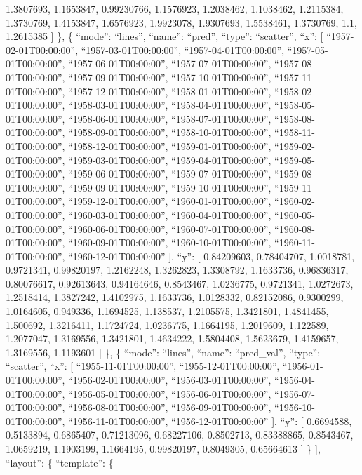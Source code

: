 \documentclass[
]{article}
\begin{document}
1.3807693, 1.1653847, 0.99230766, 1.1576923, 1.2038462, 1.1038462,
1.2115384, 1.3730769, 1.4153847, 1.6576923, 1.9923078, 1.9307693,
1.5538461, 1.3730769, 1.1, 1.2615385 {]} \}, \{ ``mode'': ``lines'',
``name'': ``pred'', ``type'': ``scatter'', ``x'': {[}
``1957-02-01T00:00:00'', ``1957-03-01T00:00:00'',
``1957-04-01T00:00:00'', ``1957-05-01T00:00:00'',
``1957-06-01T00:00:00'', ``1957-07-01T00:00:00'',
``1957-08-01T00:00:00'', ``1957-09-01T00:00:00'',
``1957-10-01T00:00:00'', ``1957-11-01T00:00:00'',
``1957-12-01T00:00:00'', ``1958-01-01T00:00:00'',
``1958-02-01T00:00:00'', ``1958-03-01T00:00:00'',
``1958-04-01T00:00:00'', ``1958-05-01T00:00:00'',
``1958-06-01T00:00:00'', ``1958-07-01T00:00:00'',
``1958-08-01T00:00:00'', ``1958-09-01T00:00:00'',
``1958-10-01T00:00:00'', ``1958-11-01T00:00:00'',
``1958-12-01T00:00:00'', ``1959-01-01T00:00:00'',
``1959-02-01T00:00:00'', ``1959-03-01T00:00:00'',
``1959-04-01T00:00:00'', ``1959-05-01T00:00:00'',
``1959-06-01T00:00:00'', ``1959-07-01T00:00:00'',
``1959-08-01T00:00:00'', ``1959-09-01T00:00:00'',
``1959-10-01T00:00:00'', ``1959-11-01T00:00:00'',
``1959-12-01T00:00:00'', ``1960-01-01T00:00:00'',
``1960-02-01T00:00:00'', ``1960-03-01T00:00:00'',
``1960-04-01T00:00:00'', ``1960-05-01T00:00:00'',
``1960-06-01T00:00:00'', ``1960-07-01T00:00:00'',
``1960-08-01T00:00:00'', ``1960-09-01T00:00:00'',
``1960-10-01T00:00:00'', ``1960-11-01T00:00:00'',
``1960-12-01T00:00:00'' {]}, ``y'': {[} 0.84209603, 0.78404707,
1.0018781, 0.9721341, 0.99820197, 1.2162248, 1.3262823, 1.3308792,
1.1633736, 0.96836317, 0.80076617, 0.92613643, 0.94164646, 0.8543467,
1.0236775, 0.9721341, 1.0272673, 1.2518414, 1.3827242, 1.4102975,
1.1633736, 1.0128332, 0.82152086, 0.9300299, 1.0164605, 0.949336,
1.1694525, 1.138537, 1.2105575, 1.3421801, 1.4841455, 1.500692,
1.3216411, 1.1724724, 1.0236775, 1.1664195, 1.2019609, 1.122589,
1.2077047, 1.3169556, 1.3421801, 1.4634222, 1.5804408, 1.5623679,
1.4159657, 1.3169556, 1.1193601 {]} \}, \{ ``mode'': ``lines'',
``name'': ``pred\_val'', ``type'': ``scatter'', ``x'': {[}
``1955-11-01T00:00:00'', ``1955-12-01T00:00:00'',
``1956-01-01T00:00:00'', ``1956-02-01T00:00:00'',
``1956-03-01T00:00:00'', ``1956-04-01T00:00:00'',
``1956-05-01T00:00:00'', ``1956-06-01T00:00:00'',
``1956-07-01T00:00:00'', ``1956-08-01T00:00:00'',
``1956-09-01T00:00:00'', ``1956-10-01T00:00:00'',
``1956-11-01T00:00:00'', ``1956-12-01T00:00:00'' {]}, ``y'': {[}
0.6694588, 0.5133894, 0.6865407, 0.71213096, 0.68227106, 0.8502713,
0.83388865, 0.8543467, 1.0659219, 1.1903199, 1.1664195, 0.99820197,
0.8049305, 0.65664613 {]} \} {]}, ``layout'': \{ ``template'': \{
\end{document}
